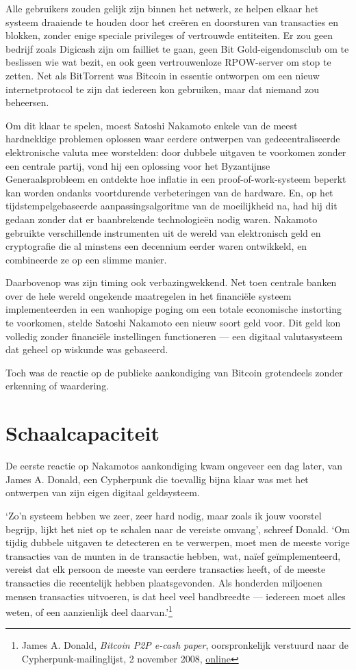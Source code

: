 \documentclass[
  a5paper,
  smalldemyvopaper,11pt,twoside,onecolumn,openright,extrafontsizes,
hidelinks]{memoir}
\begin{document}
Alle gebruikers zouden gelijk zijn binnen het netwerk, ze helpen elkaar
het systeem draaiende te houden door het creëren en doorsturen van
transacties en blokken, zonder enige speciale privileges of vertrouwde
entiteiten. Er zou geen bedrijf zoals Digicash zijn om failliet te gaan,
geen Bit Gold-eigendomsclub om te beslissen wie wat bezit, en ook geen
vertrouwenloze RPOW-server om stop te zetten. Net als BitTorrent was
Bitcoin in essentie ontworpen om een nieuw internetprotocol te zijn dat
iedereen kon gebruiken, maar dat niemand zou beheersen.

Om dit klaar te spelen, moest Satoshi Nakamoto enkele van de meest
hardnekkige problemen oplossen waar eerdere ontwerpen van
gedecentraliseerde elektronische valuta mee worstelden: door dubbele
uitgaven te voorkomen zonder een centrale partij, vond hij een oplossing
voor het Byzantijnse Generaalsprobleem en ontdekte hoe inflatie in een
proof-of-work-systeem beperkt kan worden ondanks voortdurende
verbeteringen van de hardware. En, op het tijdstempelgebaseerde
aanpassingsalgoritme van de moeilijkheid na, had hij dit gedaan zonder
dat er baanbrekende technologieën nodig waren. Nakamoto gebruikte
verschillende instrumenten uit de wereld van elektronisch geld en
cryptografie die al minstens een decennium eerder waren ontwikkeld, en
combineerde ze op een slimme manier.

Daarbovenop was zijn timing ook verbazingwekkend. Net toen centrale
banken over de hele wereld ongekende maatregelen in het financiële
systeem implementeerden in een wanhopige poging om een totale
economische instorting te voorkomen, stelde Satoshi Nakamoto een nieuw
soort geld voor. Dit geld kon volledig zonder financiële instellingen
functioneren --- een digitaal valutasysteem dat geheel op wiskunde was
gebaseerd.

Toch was de reactie op de publieke aankondiging van Bitcoin grotendeels
zonder erkenning of waardering.

\section{Schaalcapaciteit}\label{schaalcapaciteit}

De eerste reactie op Nakamotos aankondiging kwam ongeveer een dag later,
van James A. Donald, een Cypherpunk die toevallig bijna klaar was met
het ontwerpen van zijn eigen digitaal geldsysteem.

`Zo'n systeem hebben we zeer, zeer hard nodig, maar zoals ik jouw
voorstel begrijp, lijkt het niet op te schalen naar de vereiste omvang',
schreef Donald. `Om tijdig dubbele uitgaven te detecteren en te
verwerpen, moet men de meeste vorige transacties van de munten in de
transactie hebben, wat, naïef geïmplementeerd, vereist dat elk persoon
de meeste van eerdere transacties heeft, of de meeste transacties die
recentelijk hebben plaatsgevonden. Als honderden miljoenen mensen
transacties uitvoeren, is dat heel veel bandbreedte --- iedereen moet
alles weten, of een aanzienlijk deel daarvan.'\footnote{James A. Donald,
  \emph{Bitcoin P2P e-cash paper}, oorspronkelijk verstuurd naar de
  Cypherpunk-mailinglijst, 2 november 2008,
  \href{https://www.metzdowd.com/pipermail/cryptography/2008-November/014814.html}{online}}
\end{document}
